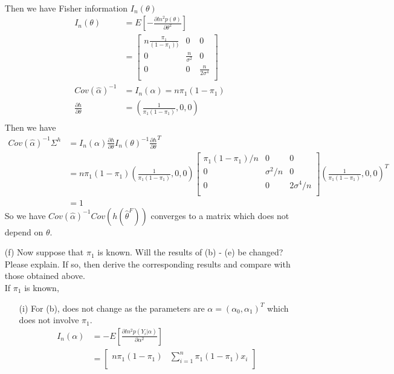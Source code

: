 \documentclass[11pt]{article} %
\begin{document}
\begin{itemize}
\begin{align*}
	\end{align*} 
	Then we have Fisher information $I_n(\theta) $
	\begin{align*}   
		I_n(\theta) &= E[-\frac{\partial ln^2 p(\theta)}{\partial \theta^2}] \\
		&= \begin{bmatrix}
			n\frac{\pi_1}{(1-\pi_1))}  & 0 & 0 \\
			0 & \frac{n}{\sigma^2}   &  0 \\
			0 &  0 & \frac{n}{2\sigma^4} \\
		\end{bmatrix}\\
		Cov(\hat\alpha)^{-1} &= I_n(\alpha) = n\pi_1(1-\pi_1)\\
		\frac{\partial h}{\partial \theta} &= (\frac{1}{\pi_1(1-\pi_1)}, 0 , 0)\\
	\end{align*} 
	Then we have
	\begin{align*}   
		Cov(\hat\alpha)^{-1} \Sigma^{h} &= I_n(\alpha) \frac{\partial h}{\partial \theta} I_n(\theta)^{-1} \frac{\partial h}{\partial \theta}^T\\
		&=  n\pi_1(1-\pi_1)  (\frac{1}{\pi_1(1-\pi_1)}, 0 , 0) \begin{bmatrix}
			\pi_1(1-\pi_1)/n  & 0 & 0 \\
			0 & \sigma^2/n   &  0 \\
			0 &  0 & 2\sigma^4/n \\
		\end{bmatrix} (\frac{1}{\pi_1(1-\pi_1)}, 0 , 0)^T\\   
		&= 1
	\end{align*}     
	So we have $Cov(\hat\alpha)^{-1} Cov(h(\hat\theta^F))$ converges to a matrix which does not depend on $\theta$.
	\item[(f)]Now suppose that $\pi_1$ is known. Will the results of (b) - (e) be changed? Please
	explain. If so, then derive the corresponding results and compare with those obtained
	above.\\
	If $\pi_1$ is known,
	\begin{itemize}
		\item [(i)] For (b), does not change as the parameters are $\alpha = (\alpha_0, \alpha_1)^T$ which does not involve $\pi_1$.
		\begin{align*}
			I_n(\alpha) &= -E[ \frac{\partial ln^2 p(Y_i|\alpha)}{\partial \alpha^2}]\\
			&= \begin{bmatrix}
				n \pi_1 (1-\pi_1) &   \sum_{i=1}^n \pi_1 (1-\pi_1)x_i\\

\end{bmatrix}
\end{align*}
\end{itemize}
\end{itemize}
\end{document}
